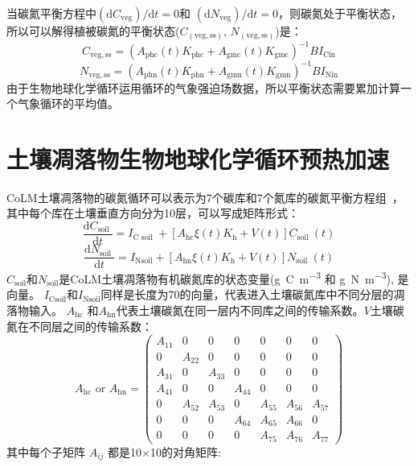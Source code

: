 当碳氮平衡方程中$({\mathrm {d}} C_{\mathrm{veg}})/{\mathrm {d}} t=0$和 $({\mathrm {d}} N_{\mathrm{veg}})/{\mathrm {d}} t=0$，则碳氮处于平衡状态，所以可以解得植被碳氮的平衡状态($C_{\mathrm{(veg,ss)}}$, $N_{\mathrm{(veg,ss)}}$)是：
\begin{equation}
  C_{\mathrm{veg, s s}}=\left(A_{\mathrm{p h c}}(t) K_{\mathrm{p h c}}+A_{\mathrm{gmc}}(t) K_{\mathrm{gmc}}\right)^{-1} B I_{\mathrm{{Cin }}}
\end{equation}
\begin{equation}
  N_{\mathrm{veg, s s}}=\left(A_{\mathrm{phn}}(t) K_{\mathrm{phn}}+A_{\mathrm{gmn}}(t) K_{\mathrm{gmn}}\right)^{-1} B I_{\mathrm{Nin}}
\end{equation}
由于生物地球化学循环运用循环的气象强迫场数据，所以平衡状态需要累加计算一个气象循环的平均值。


\section{土壤凋落物生物地球化学循环预热加速}
CoLM土壤凋落物的碳氮循环可以表示为7个碳库和7个氮库的碳氮平衡方程组~\citep{lu2020full}，其中每个库在土壤垂直方向分为10层，可以写成矩阵形式：
\begin{equation}
  \frac{{\mathrm {d}} C_{\text {soil }}}{{\mathrm {d}} t}=I_{\mathrm{C \text { soil }}}+\left[A_{\mathrm{h c}} \xi(t) K_{\mathrm{h}}+V(t)\right] C_{\text {soil }}(t)
\end{equation}
\begin{equation}
  \frac{{\mathrm {d}} N_{\text {soil }}}{{\mathrm {d}} t}=I_{\mathrm{N s o i l}}+\left[A_{\mathrm{h n}} \xi(t) K_{\mathrm{h}}+V(t)\right] N_{\text {soil }}(t)
\end{equation}
$C_{\mathrm{soil}}$和$N_{\mathrm{soil}}$是CoLM土壤凋落物有机碳氮库的状态变量(\unit{g.C.m^{-3}} 和 \unit{g.N.m^{-3}}), 是向量。
$I_{\mathrm{Csoil}}$和$I_{\mathrm{Nsoil}}$同样是长度为70的向量，代表进入土壤碳氮库中不同分层的凋落物输入。
$A_{\mathrm{hc}}$ 和$A_{\mathrm{hn}}$代表土壤碳氮在同一层内不同库之间的传输系数。$V$土壤碳氮在不同层之间的传输系数：
\begin{equation}
  A_{\mathrm{h c}} \text { or } A_{\mathrm{h n}}=\left(\begin{array}{ccccccc}
      A_{11} & 0 & 0 & 0 & 0 & 0 & 0 \\
      0 & A_{22} & 0 & 0 & 0 & 0 & 0 \\
      A_{31} & 0 & A_{33} & 0 & 0 & 0 & 0 \\
      A_{41} & 0 & 0 & A_{44} & 0 & 0 & 0 \\
      0 & A_{52} & A_{53} & 0 & A_{55} & A_{56} & A_{57} \\
      0 & 0 & 0 & A_{64} & A_{65} & A_{66} & 0 \\
  0 & 0 & 0 & 0 & A_{75} & A_{76} & A_{77}\end{array}\right)
\end{equation}
其中每个子矩阵 $A_{ij}$ 都是10$\times$10的对角矩阵:

